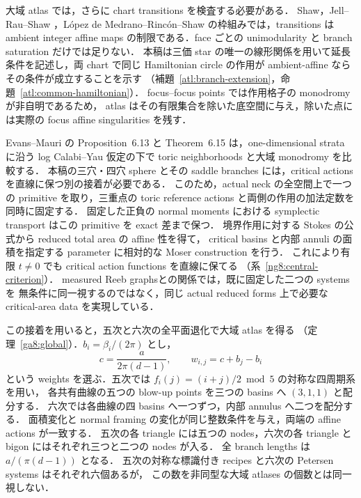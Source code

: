 大域 atlas では，さらに chart transitions を検査する必要がある．
Shaw\cite[Definition~3.1]{ShawSurfaces}，Jell--Rau--Shaw
\cite[Definitions~2.1, 3.1, 5.1]{JellRauShaw}，L\'opez de Medrano--Rinc\'on--Shaw
\cite[Definitions~2.2--2.4]{LRSChern}の枠組みでは，transitions は ambient integer affine maps
の制限である．face ごとの unimodularity と branch saturation だけでは足りない．
本稿は三価 star の唯一の線形関係を用いて延長条件を記述し，両 chart で同じ Hamiltonian
circle の作用が ambient-affine ならその条件が成立することを示す
（補題~\ref{atl:branch-extension}，命題~\ref{atl:common-hamiltonian}）．
focus--focus points では作用格子の monodromy が非自明である\cite[Remark~3.1]{VuNgoc}ため，
atlas はその有限集合を除いた底空間に与え，除いた点には実際の focus affine singularities を残す．

Evans--Mauri の Proposition~6.13 と Theorem~6.15 は，one-dimensional strata に沿う
log Calabi--Yau 仮定の下で toric neighborhoods と大域 monodromy を比較する\cite{EM}．
本稿の三穴・四穴 sphere とその saddle branches には，critical actions を直線に保つ別の接着が必要である．
このため，actual neck の全空間上で一つの primitive を取り，三重点の toric reference actions
と両側の作用の加法定数を同時に固定する．
固定した正負の normal moments における symplectic transport はこの primitive を exact 差まで保つ．
境界作用に対する Stokes の公式から reduced total area の affine 性を得て，
critical basins と内部 annuli の面積を指定する parameter に相対的な Moser construction を行う．
これにより有限 $t\ne0$ でも critical action functions を直線に保てる
（系~\ref{ng8:central-criterion}）．
measured Reeb graphs\cite{DMT,IKM}との関係では，既に固定した二つの systems を
無条件に同一視するのではなく，同じ actual reduced forms 上で必要な critical-area data を実現している．

この接着を用いると，五次と六次の全平面退化で大域 atlas を得る
（定理~\ref{ga8:global}）．$b_i=\beta_i/(2\pi)$ とし，
\[
 c=\frac{a}{2\pi(d-1)},\qquad w_{i,j}=c+b_j-b_i
\]
という weights を選ぶ．五次では $f_i(j)=(i+j)/2\bmod5$ の対称な四周期系を用い，
各共有曲線の五つの blow-up points を三つの basins へ $(3,1,1)$ と配分する．
六次では各曲線の四 basins へ一つずつ，内部 annulus へ二つを配分する．
面積変化と normal framing の変化が同じ整数条件を与え，両端の affine actions が一致する．
五次の各 triangle には五つの nodes，六次の各 triangle と bigon にはそれぞれ三つと二つの nodes が入る．
全 branch lengths は $a/(\pi(d-1))$ となる．
五次の対称な標識付き recipes と六次の Petersen systems はそれぞれ六個あるが，
この数を非同型な大域 atlases の個数とは同一視しない．

